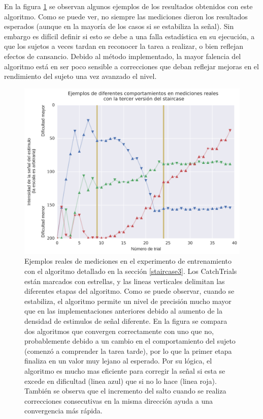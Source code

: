 \documentclass{article}
\numberwithin{figure}{section}
\begin{document}
    En la figura \ref{fig:staircase3} se observan algunos ejemplos de los resultados obtenidos con este algoritmo. Como se puede ver, no siempre las mediciones dieron los resultados esperados (aunque en la mayoría de los casos si se estabiliza la señal). Sin embargo es difícil definir si esto se debe a una falla estadística en su ejecución, a que los sujetos a veces tardan en reconocer la tarea a realizar, o bien reflejan efectos de cansancio. Debido al método implementado, la mayor falencia del algoritmo está en ser poco sensible a correcciones que deban reflejar mejoras en el rendimiento del sujeto una vez avanzado el nivel. 
    
    \begin{figure}
        \center
        \includegraphics[width=\textwidth]{Imagenes/StairCase3.png}
        \caption{Ejemplos reales de mediciones en el experimento de entrenamiento con el algoritmo detallado en la sección \ref{staircase3}. Los CatchTrials están marcados con estrellas, y las lineas verticales delimitan las diferentes etapas del algoritmo. Como se puede observar, cuando se estabiliza, el algoritmo permite un nivel de precisión mucho mayor que en las implementaciones anteriores debido al aumento de la densidad de estimulos de señal diferente. En la figura se compara dos algoritmos que convergen correctamente con uno que no, probablemente debido a un cambio en el comportamiento del sujeto (comenzó a comprender la tarea tarde), por lo que la primer etapa finaliza en un valor muy lejano al esperado. Por su lógica, el algoritmo es mucho mas eficiente para corregir la señal si esta se excede en dificultad (linea azul) que si no lo hace (linea roja). También se observa que el incremento del salto cuando se realiza correcciones consecutivas en la misma dirección ayuda a una convergencia más rápida.}
        \label{fig:staircase3}
    \end{figure}  
    
\end{document}
